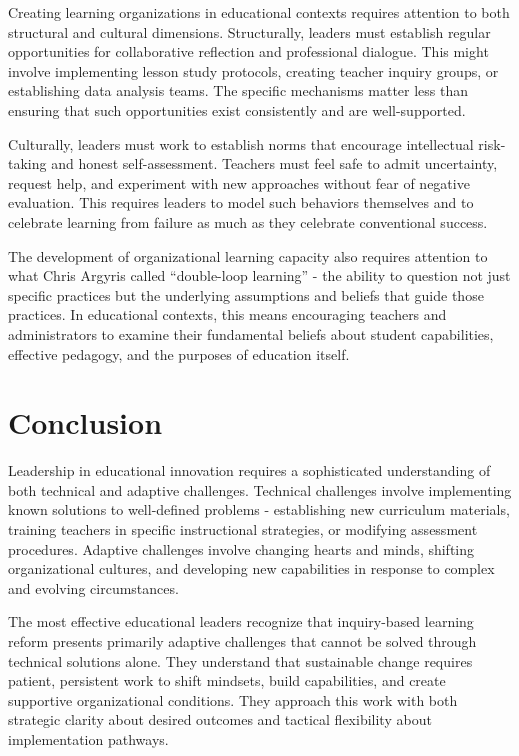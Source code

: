 \documentclass[
  Letterpaper,
]{scrbook}
\begin{document}
Creating learning organizations in educational contexts requires
attention to both structural and cultural dimensions. Structurally,
leaders must establish regular opportunities for collaborative
reflection and professional dialogue. This might involve implementing
lesson study protocols, creating teacher inquiry groups, or establishing
data analysis teams. The specific mechanisms matter less than ensuring
that such opportunities exist consistently and are well-supported.

Culturally, leaders must work to establish norms that encourage
intellectual risk-taking and honest self-assessment. Teachers must feel
safe to admit uncertainty, request help, and experiment with new
approaches without fear of negative evaluation. This requires leaders to
model such behaviors themselves and to celebrate learning from failure
as much as they celebrate conventional success.

The development of organizational learning capacity also requires
attention to what Chris Argyris called ``double-loop learning'' - the
ability to question not just specific practices but the underlying
assumptions and beliefs that guide those practices. In educational
contexts, this means encouraging teachers and administrators to examine
their fundamental beliefs about student capabilities, effective
pedagogy, and the purposes of education itself.

\section{Conclusion}\label{conclusion-2}

Leadership in educational innovation requires a sophisticated
understanding of both technical and adaptive challenges. Technical
challenges involve implementing known solutions to well-defined problems
- establishing new curriculum materials, training teachers in specific
instructional strategies, or modifying assessment procedures. Adaptive
challenges involve changing hearts and minds, shifting organizational
cultures, and developing new capabilities in response to complex and
evolving circumstances.

The most effective educational leaders recognize that inquiry-based
learning reform presents primarily adaptive challenges that cannot be
solved through technical solutions alone. They understand that
sustainable change requires patient, persistent work to shift mindsets,
build capabilities, and create supportive organizational conditions.
They approach this work with both strategic clarity about desired
outcomes and tactical flexibility about implementation pathways.
\end{document}
